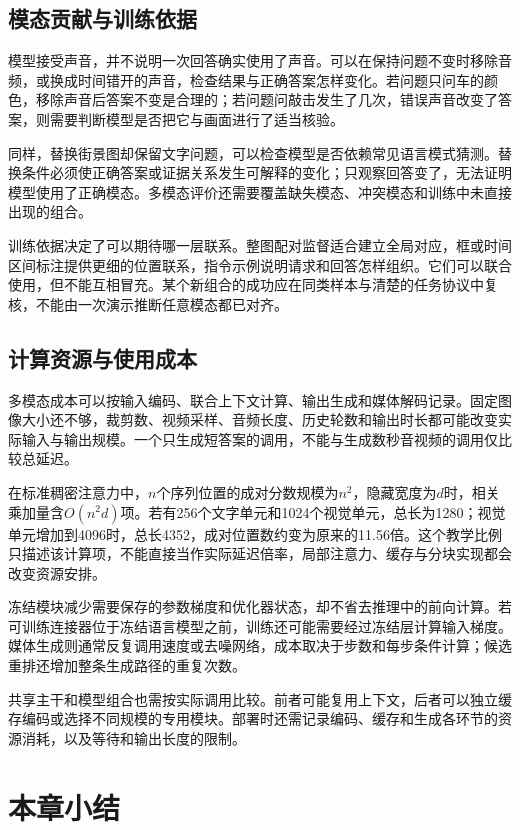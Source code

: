 \subsection{模态贡献与训练依据}
\label{sec:vision-models-modality-contribution}

模型接受声音，并不说明一次回答确实使用了声音。可以在保持问题不变时移除音频，或换成时间错开的声音，检查结果与正确答案怎样变化。若问题只问车的颜色，移除声音后答案不变是合理的；若问题问敲击发生了几次，错误声音改变了答案，则需要判断模型是否把它与画面进行了适当核验。

同样，替换街景图却保留文字问题，可以检查模型是否依赖常见语言模式猜测。替换条件必须使正确答案或证据关系发生可解释的变化；只观察回答变了，无法证明模型使用了正确模态。多模态评价还需要覆盖缺失模态、冲突模态和训练中未直接出现的组合。

训练依据决定了可以期待哪一层联系。整图配对监督适合建立全局对应，框或时间区间标注提供更细的位置联系，指令示例说明请求和回答怎样组织。它们可以联合使用，但不能互相冒充。某个新组合的成功应在同类样本与清楚的任务协议中复核，不能由一次演示推断任意模态都已对齐。

\subsection{计算资源与使用成本}
\label{sec:vision-models-cost}

多模态成本可以按输入编码、联合上下文计算、输出生成和媒体解码记录。固定图像大小还不够，裁剪数、视频采样、音频长度、历史轮数和输出时长都可能改变实际输入与输出规模。一个只生成短答案的调用，不能与生成数秒音视频的调用仅比较总延迟。

在标准稠密注意力中，$n$个序列位置的成对分数规模为$n^2$，隐藏宽度为$d$时，相关乘加量含$O(n^2d)$项。若有256个文字单元和1024个视觉单元，总长为1280；视觉单元增加到4096时，总长4352，成对位置数约变为原来的11.56倍。这个教学比例只描述该计算项，不能直接当作实际延迟倍率，局部注意力、缓存与分块实现都会改变资源安排。

冻结模块减少需要保存的参数梯度和优化器状态，却不省去推理中的前向计算。若可训练连接器位于冻结语言模型之前，训练还可能需要经过冻结层计算输入梯度。媒体生成则通常反复调用速度或去噪网络，成本取决于步数和每步条件计算；候选重排还增加整条生成路径的重复次数。

共享主干和模型组合也需按实际调用比较。前者可能复用上下文，后者可以独立缓存编码或选择不同规模的专用模块。部署时还需记录编码、缓存和生成各环节的资源消耗，以及等待和输出长度的限制。

\section{本章小结}
\label{sec:vision-models-summary}

